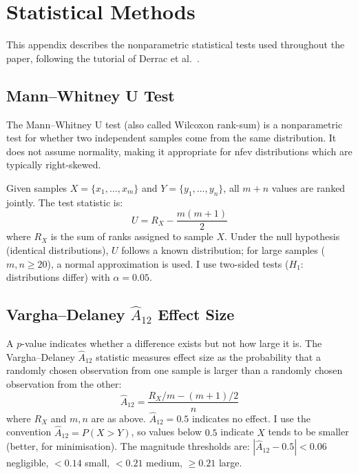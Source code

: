 \documentclass[11pt,a4paper]{article}
\begin{document}
\appendix

\section{Statistical Methods}
\label{app:stats}

This appendix describes the nonparametric statistical tests used throughout the paper, following the tutorial of Derrac et al.~\cite{derrac2011practical}.

\subsection{Mann--Whitney U Test}

The Mann--Whitney U test (also called Wilcoxon rank-sum) is a nonparametric test for whether two independent samples come from the same distribution. It does not assume normality, making it appropriate for nfev distributions which are typically right-skewed.

Given samples $X = \{x_1, \ldots, x_m\}$ and $Y = \{y_1, \ldots, y_n\}$, all $m + n$ values are ranked jointly. The test statistic is:
\begin{equation}
    U = R_X - \frac{m(m+1)}{2}
\end{equation}
where $R_X$ is the sum of ranks assigned to sample $X$. Under the null hypothesis (identical distributions), $U$ follows a known distribution; for large samples ($m, n \geq 20$), a normal approximation is used. I use two-sided tests ($H_1$: distributions differ) with $\alpha = 0.05$.

\subsection{Vargha--Delaney $\hat{A}_{12}$ Effect Size}

A $p$-value indicates whether a difference exists but not how large it is. The Vargha--Delaney $\hat{A}_{12}$ statistic measures effect size as the probability that a randomly chosen observation from one sample is larger than a randomly chosen observation from the other:
\begin{equation}
    \hat{A}_{12} = \frac{R_X / m - (m+1)/2}{n}
\end{equation}
where $R_X$ and $m, n$ are as above. $\hat{A}_{12} = 0.5$ indicates no effect. I use the convention $\hat{A}_{12} = P(X > Y)$, so values below $0.5$ indicate $X$ tends to be smaller (better, for minimisation). The magnitude thresholds are: $|{\hat{A}_{12} - 0.5}| < 0.06$ negligible, $< 0.14$ small, $< 0.21$ medium, $\geq 0.21$ large.
\end{document}
